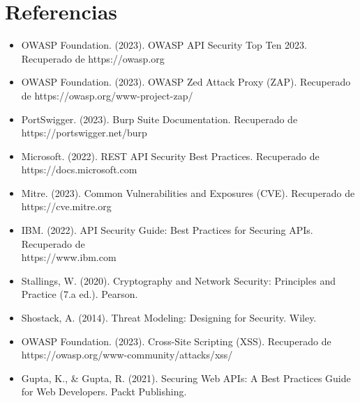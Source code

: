 \documentclass{article}
\begin{document}
    \section{Referencias}
    \begin{itemize}
        \item OWASP Foundation. (2023). OWASP API Security Top Ten 2023. Recuperado de 
        https://owasp.org
        \item OWASP Foundation. (2023). OWASP Zed Attack Proxy (ZAP). Recuperado de
        https://owasp.org/www-project-zap/
        \item PortSwigger. (2023). Burp Suite Documentation. Recuperado de 
        \\ https://portswigger.net/burp
        \item Microsoft. (2022). REST API Security Best Practices. Recuperado de 
        \\ https://docs.microsoft.com
        \item Mitre. (2023). Common Vulnerabilities and Exposures (CVE). Recuperado de https://cve.mitre.org
        \item IBM. (2022). API Security Guide: Best Practices for Securing APIs. Recuperado de 
        \\ https://www.ibm.com
        \item Stallings, W. (2020). Cryptography and Network Security: Principles and Practice (7.a ed.). Pearson.
        \item Shostack, A. (2014). Threat Modeling: Designing for Security. Wiley.
        \item OWASP Foundation. (2023). Cross-Site Scripting (XSS). Recuperado de 
        \\ https://owasp.org/www-community/attacks/xss/
        \item Gupta, K., \& Gupta, R. (2021). Securing Web APIs: A Best Practices Guide for Web Developers. Packt Publishing.
    \end{itemize}
\end{document}
